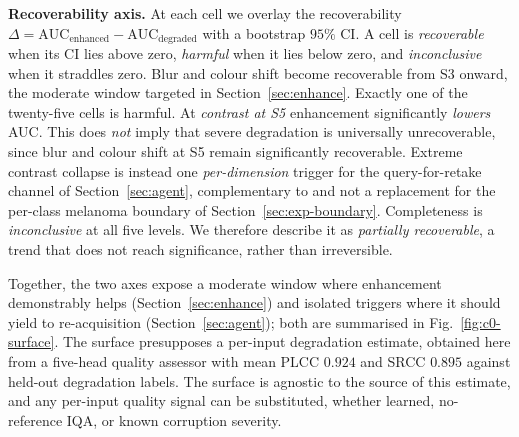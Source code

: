 \textbf{Recoverability axis.}
At each cell we overlay the recoverability $\Delta = \mathrm{AUC}_{\mathrm{enhanced}} - \mathrm{AUC}_{\mathrm{degraded}}$ with a bootstrap $95\%$ CI. A cell is \emph{recoverable} when its CI lies above zero, \emph{harmful} when it lies below zero, and \emph{inconclusive} when it straddles zero. Blur and colour shift become recoverable from S3 onward, the moderate window targeted in Section~\ref{sec:enhance}. Exactly one of the twenty-five cells is harmful. At \emph{contrast at S5} enhancement significantly \emph{lowers} AUC. This does \emph{not} imply that severe degradation is universally unrecoverable, since blur and colour shift at S5 remain significantly recoverable. Extreme contrast collapse is instead one \emph{per-dimension} trigger for the query-for-retake channel of Section~\ref{sec:agent}, complementary to and not a replacement for the per-class melanoma boundary of Section~\ref{sec:exp-boundary}. Completeness is \emph{inconclusive} at all five levels. We therefore describe it as \emph{partially recoverable}, a trend that does not reach significance, rather than irreversible.

Together, the two axes expose a moderate window where enhancement demonstrably helps (Section~\ref{sec:enhance}) and isolated triggers where it should yield to re-acquisition (Section~\ref{sec:agent}); both are summarised in Fig.~\ref{fig:c0-surface}. The surface presupposes a per-input degradation estimate, obtained here from a five-head quality assessor \visiscore{} with mean PLCC $0.924$ and SRCC $0.895$ against held-out degradation labels. The surface is agnostic to the source of this estimate, and any per-input quality signal can be substituted, whether learned, no-reference IQA, or known corruption severity.


